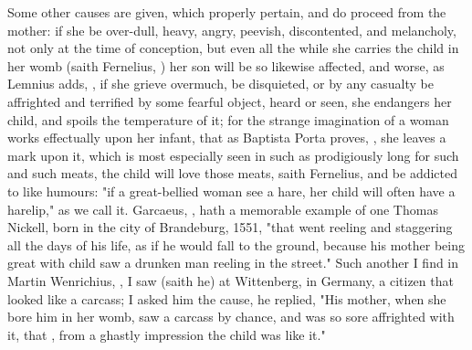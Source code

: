Some other causes are given, which properly pertain, and do proceed from the
mother: if she be over-dull, heavy, angry, peevish, discontented, and
melancholy, not only at the time of conception, but even all the while she
carries the child in her womb (saith Fernelius, ) her son will be so likewise affected, and worse, as
Lemnius adds, , if she
grieve overmuch, be disquieted, or by any casualty be affrighted and terrified
by some fearful object, heard or seen, she endangers her child, and spoils the
temperature of it; for the strange imagination of a woman works effectually
upon her infant, that as Baptista Porta proves, , she leaves a mark upon it, which is most especially
seen in such as prodigiously long for such and such meats, the child will love
those meats, saith Fernelius, and be addicted to like humours:
"if a great-bellied woman see a hare, her child will often
have a harelip," as we call it. Garcaeus, , hath a memorable example of one Thomas Nickell, born in
the city of Brandeburg, 1551, "that went reeling and
staggering all the days of his life, as if he would fall to the ground, because
his mother being great with child saw a drunken man reeling in the street."
Such another I find in Martin Wenrichius, , I saw (saith he) at Wittenberg, in Germany, a citizen that
looked like a carcass; I asked him the cause, he replied,
"His mother, when she bore him in her womb, saw a carcass
by chance, and was so sore affrighted with it, that , from a ghastly impression the child was like it."

